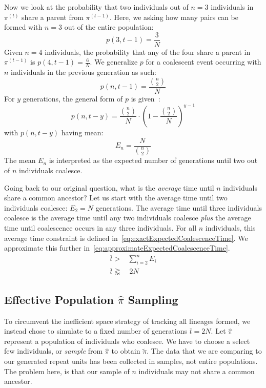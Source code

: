 Now we look at the probability that two individuals out of $n=3$ individuals in $\pi^{(t)}$ share a parent
from $\pi^{(t-1)}$.
Here, we asking how many pairs can be formed with $n=3$ out of the entire population:
\begin{equation}
    p(3, t-1) = \frac{3}{N}
\end{equation}
Given $n=4$ individuals, the probability that any of the four share a parent in $\pi^{(t-1)}$ is
$p(4, t-1) = \frac{6}{N}$.
We generalize $p$ for a coalescent event occurring with $n$ individuals in the previous generation as such:
\begin{equation}
    p(n, t-1) = \frac{\binom{n}{2}}{N}
\end{equation}
For $y$ generations, the general form of $p$ is given~\cite{hudsonGeneGenealogiesCoalescent1990}:
\begin{equation}
    p(n, t-y) = \frac{\binom{n}{2}}{N} \cdot \left(1 - \frac{\binom{n}{2}}{N}\right)^{y-1}
\end{equation}
with $p(n, t-y)$ having mean:
\begin{equation}\label{eq:expectedMeanCoa}
    E_n = \frac{N}{\binom{n}{2}}
\end{equation}
The mean $E_n$ is interpreted as the expected number of generations until two out of $n$ individuals coalesce.

Going back to our original question, what is the \emph{average} time until $n$ individuals share a common ancestor?
Let us start with the average time until two individuals coalesce: $E_2 = N$ generations.
The average time until three individuals coalesce is the average time until any two individuals coalesce \emph{plus} the
average time until coalescence occurs in any three individuals.
For all $n$ individuals, this average time constraint is defined in~\autoref{eq:exactExpectedCoalescenceTime}.
We approximate this further in~\autoref{eq:approximateExpectedCoalescenceTime}.
\begin{align}
    \overbar{t} >& \sum_{i=2}^{n} E_i \label{eq:exactExpectedCoalescenceTime} \\
    \overbar{t} \gtrapprox& \ 2N \label{eq:approximateExpectedCoalescenceTime}
\end{align}

\subsection{Effective Population $\hat{\pi}$ Sampling}\label{subsec:effectivePopulationPiSampling}
To circumvent the inefficient space strategy of tracking all lineages formed, we instead chose to simulate to a fixed
number of generations $\overbar{t} = 2N$.
Let $\hat{\pi}$ represent a population of individuals who coalesce.
We have to choose a select few individuals, or \emph{sample} from $\hat{\pi}$ to obtain $\tilde{\pi}$.
The data that we are comparing to our generated repeat units has been collected in samples, not entire populations.
The problem here, is that our sample of $n$ individuals may not share a common ancestor.

